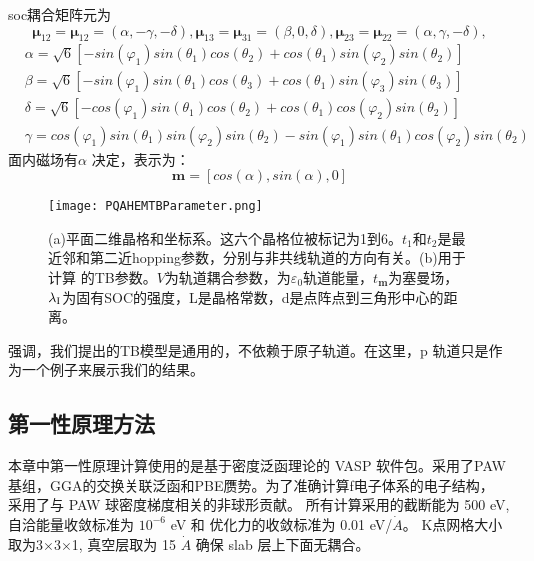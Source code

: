soc耦合矩阵元为
\begin{equation*}
  \symbf{\mu}_{12} = \symbf{\mu}_{12} = (\alpha, -\gamma, -\delta), \symbf{\mu}_{13} = \symbf{\mu}_{31} = (\beta, 0, \delta ), 
  \symbf{\mu}_{23} = \symbf{\mu}_{22} = (\alpha, \gamma, -\delta),
\end{equation*}
\begin{equation*}
  \begin{split}
    &\alpha  = \sqrt{6}[-sin(\varphi_1)sin(\theta_1)cos(\theta_2) + cos(\theta_1)sin(\varphi_2)sin(\theta_2)] \\
    &\beta   = \sqrt{6}[-sin(\varphi_1)sin(\theta_1)cos(\theta_3) + cos(\theta_1)sin(\varphi_3)sin(\theta_3)] \\
    &\delta  = \sqrt{6}[-cos(\varphi_1)sin(\theta_1)cos(\theta_2) + cos(\theta_1)cos(\varphi_2)sin(\theta_2)] \\
    &\gamma  = cos(\varphi_1)sin(\theta_1)sin(\varphi_2)sin(\theta_2) - sin(\varphi_1)sin(\theta_1)cos(\varphi_2)sin(\theta_2) 
  \end{split}  
\end{equation*}
面内磁场有$\alpha$ 决定，表示为：
\begin{equation*}
  \symbf{m}=[cos(\alpha), sin(\alpha), 0]
\end{equation*}
\begin{figure}[htb]
  \centering
  \texttt{[image: PQAHEMTBParameter.png]}
  \caption{ (a)平面二维晶格和坐标系。这六个晶格位被标记为1到6。$t_1$和$t_2$是最近邻和第二近hopping参数，分别与非共线轨道的方向有关。(b)用于计算
  的TB参数。$V$为轨道耦合参数，为$\varepsilon_0$轨道能量，$t_{\symbf{m}}$为塞曼场，$\lambda{\rm_I}$为固有SOC的强度，L是晶格常数，d是点阵点到三角形中心的距离。}
  \label{PQAHETBParameter}
  \note{}
\end{figure}
强调，我们提出的TB模型是通用的，不依赖于原子轨道。在这里，p 轨道只是作为一个例子来展示我们的结果。

\subsection{第一性原理方法}
本章中第一性原理计算使用的是基于密度泛函理论的 VASP 软件包。采用了PAW基组，GGA的交换关联泛函和PBE赝势。为了准确计算f电子体系的电子结构，
采用了与 PAW 球密度梯度相关的非球形贡献。 所有计算采用的截断能为 500 eV, 自洽能量收敛标准为 $10^{-6}$ eV 和 优化力的收敛标准为 0.01 eV/$\dot{A}$。
K点网格大小取为3$\times$3$\times$1, 真空层取为 15 $\dot{A}$ 确保 slab 层上下面无耦合。

